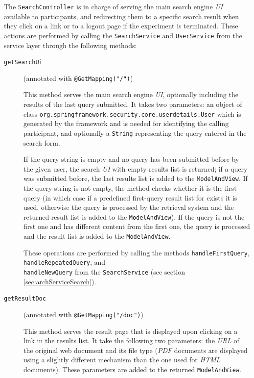 \documentclass[a4paper]{usiinfbachelorproject}
\begin{document}
The \texttt{SearchController} is in charge of serving the main search engine \emph{UI} available to
participants, and redirecting them to a specific search result when they click on a link or to a logout
page if the experiment is terminated. These actions are performed by calling the \texttt{SearchService} and
\texttt{UserService} from the service layer through the following methods:

    \begin{description}

        \item[\texttt{getSearchUi}]
        (annotated with \texttt{@GetMapping("/")}) 

        This method serves the main search engine \emph{UI}, optionally including the results of the last query submitted.
        It takes two parameters: an object of class \texttt{org.springframework.security.core.userdetails.User} which
        is generated by the framework and is needed for identifying the calling participant, and optionally
        a \texttt{String} representing the query entered in the search form. 

        If the query string is empty and no query has been submitted before by the given user, the search \emph{UI} with
        empty results list is returned; if a query was submitted before, the last results list is added to the \texttt{ModelAndView}.
        If the query string is not empty, the method checks whether it is the first query (in which case if a predefined first-query
        result list for exists it is used, otherwise the query is processed by the retrieval system and the returned 
        result list is added to the \texttt{ModelAndView}). If the query
        is not the first one and has different content from the first one, the query is processed and the result list is 
        added to the \texttt{ModelAndView}.

        These operations are performed by calling the methods \texttt{handleFirstQuery}, \texttt{handleRepeatedQuery}, 
        and \\ \texttt{handleNewQuery} from the \texttt{SearchService} (see section \ref{sec:archServiceSearch}).

        \item[\texttt{getResultDoc}]
        (annotated with \texttt{@GetMapping("/doc")})
        
        This method serves the result page that is displayed upon clicking on a link in the results list.
        It take the following two parameters: the \emph{URL} of the original web document and its file type
        (\emph{PDF} documents are displayed using a slightly different mechanism than the one used for \emph{HTML}
        documents). These parameters are added to the returned \texttt{ModelAndView}.


\end{description}
\end{document}
